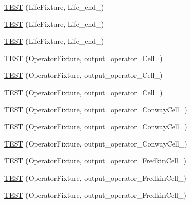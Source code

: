 \begin{DoxyCompactItemize}
\item 
\hyperlink{TestLife_8c_09_09_a121f2944dfdabcc9e97b294eef048d52}{T\-E\-S\-T} (Life\-Fixture, Life\-\_\-end\-\_)
\item 
\hyperlink{TestLife_8c_09_09_af324b7d03b943012b98cd5eb74bf6c1b}{T\-E\-S\-T} (Life\-Fixture, Life\-\_\-end\-\_)
\item 
\hyperlink{TestLife_8c_09_09_acd52e8a3ce9bf50cd112513c601b0a1a}{T\-E\-S\-T} (Life\-Fixture, Life\-\_\-end\-\_)
\item 
\hyperlink{TestLife_8c_09_09_a90888b7a60b7eb1665fcbc625c74a309}{T\-E\-S\-T} (Operator\-Fixture, output\-\_\-operator\-\_\-\-Cell\-\_)
\item 
\hyperlink{TestLife_8c_09_09_a714be13397449d27ee36e1d4b3e84b40}{T\-E\-S\-T} (Operator\-Fixture, output\-\_\-operator\-\_\-\-Cell\-\_)
\item 
\hyperlink{TestLife_8c_09_09_a907aef42bec4f6a7d3a59e46bb8c7b1f}{T\-E\-S\-T} (Operator\-Fixture, output\-\_\-operator\-\_\-\-Cell\-\_)
\item 
\hyperlink{TestLife_8c_09_09_a4c468a73e69af596649cf1c54b39fdd3}{T\-E\-S\-T} (Operator\-Fixture, output\-\_\-operator\-\_\-\-Conway\-Cell\-\_)
\item 
\hyperlink{TestLife_8c_09_09_a09d061b5b940d6eee507b03911f9c8c7}{T\-E\-S\-T} (Operator\-Fixture, output\-\_\-operator\-\_\-\-Conway\-Cell\-\_)
\item 
\hyperlink{TestLife_8c_09_09_a2cc2396e4c9ddf633b41efd6c580784f}{T\-E\-S\-T} (Operator\-Fixture, output\-\_\-operator\-\_\-\-Conway\-Cell\-\_)
\item 
\hyperlink{TestLife_8c_09_09_a477b6e46256583096fad3851a1e00c17}{T\-E\-S\-T} (Operator\-Fixture, output\-\_\-operator\-\_\-\-Fredkin\-Cell\-\_)
\item 
\hyperlink{TestLife_8c_09_09_ac69774a4e968488ee98b55a0403bef17}{T\-E\-S\-T} (Operator\-Fixture, output\-\_\-operator\-\_\-\-Fredkin\-Cell\-\_)
\item 
\hyperlink{TestLife_8c_09_09_afd2adb298dd8983d0ff5fa4943e6a5ba}{T\-E\-S\-T} (Operator\-Fixture, output\-\_\-operator\-\_\-\-Fredkin\-Cell\-\_)
\end{DoxyCompactItemize}


